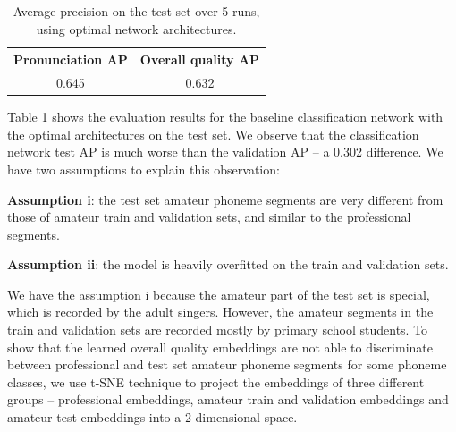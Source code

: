 \begin{table}[ht!]
\centering
\caption{Average precision on the test set over 5 runs, using optimal network architectures.}
\label{tab:ch7:baseline_test}
\begin{tabular}{cc}
\toprule
Pronunciation AP & Overall quality AP \\
\midrule
0.645            & 0.632     \\
\bottomrule
\end{tabular}
\end{table}

Table \ref{tab:ch7:baseline_test} shows the evaluation results for the baseline classification network with the optimal architectures on the test set. We observe that the classification network test \gls{AP} is much worse than the validation \gls{AP} -- a 0.302 difference. We have two assumptions to explain this observation:

\textbf{Assumption i}: the test set amateur phoneme segments are very different from those of amateur train and validation sets, and similar to the professional segments. 

\textbf{Assumption ii}: the model is heavily overfitted on the train and validation sets.

We have the assumption i because the amateur part of the test set is special, which is recorded by the adult singers. However, the amateur segments in the train and validation sets are recorded mostly by primary school students. To show that the learned overall quality embeddings are not able to discriminate between professional and test set amateur phoneme segments for some phoneme classes, we use \gls{t-SNE} technique \cite{VanDerMaaten2008} to project the embeddings of three different groups -- professional embeddings, amateur train and validation embeddings and amateur test embeddings into a 2-dimensional space.

